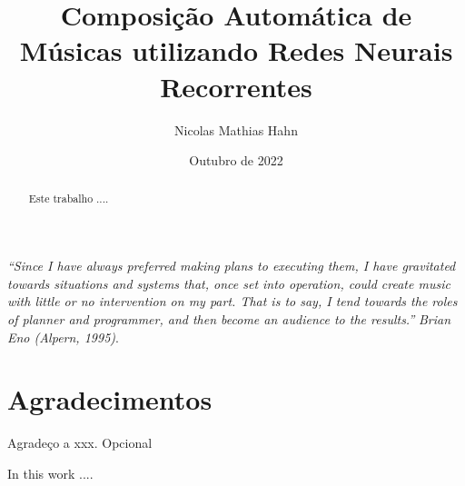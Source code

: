 \documentclass{automatextcc}
\begin{document}
\title{Composição Automática de Músicas utilizando Redes Neurais Recorrentes}
\author{Nicolas Mathias Hahn}



\dept{\DEST}

\date{Outubro de 2022}


\maketitulo

\makefolhaderosto

\makefolhadeaprovacaoA %


\newpage
\vspace*{\fill}
\begin{flushright} %
	\textit{``Since I have always preferred making plans to executing them, I have gravitated towards situations and systems that, once set into operation, could create music with little or no intervention on my part. That is to say, I tend towards the roles of planner and programmer, and then become an audience to the results.''} \newline
	\textit{Brian Eno (Alpern, 1995)}.
\end{flushright}

\newpage
\chapter*{Agradecimentos}
Agradeço a xxx. Opcional %


\begin{abstract}
Este trabalho ....
\end{abstract}
\begin{englishabstract}
In this work ....
\end{englishabstract}

\tableofcontents

\listoffigures
\end{document}
